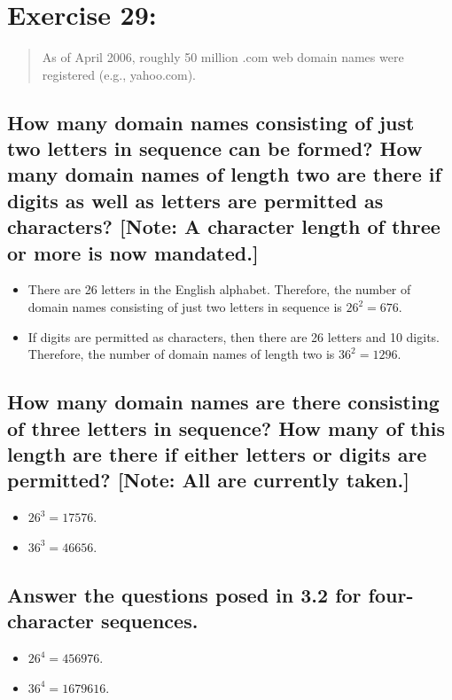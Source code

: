 \newpage
\section{Exercise 29:}
\begin{quote}
    As of April 2006, roughly 50 million .com web domain names were registered (e.g., yahoo.com).
\end{quote}

\subsection{ How many domain names consisting of just two letters in sequence can be formed? How many domain names of length two are there if digits as well as letters are permitted as characters? [Note: A character length of three or more is now mandated.]}


\begin{itemize}
    \item There are 26 letters in the English alphabet. Therefore, the number of domain names consisting of just two letters in sequence is \(26^2 = 676\).
    \item If digits are permitted as characters, then there are 26 letters and 10 digits. Therefore, the number of domain names of length two is \(36^2 = 1296\).
\end{itemize}

\subsection{How many domain names are there consisting of
three letters in sequence? How many of this length
are there if either letters or digits are permitted?
[Note: All are currently taken.]}

\begin{itemize}
    \item \(26^3 = 17576\).
    \item \(36^3 = 46656\).
\end{itemize}

\subsection{Answer the questions posed in 3.2 for four-character
    sequences.}

\begin{itemize}
    \item \(26^4 = 456976\).
    \item \(36^4 = 1679616\).
\end{itemize}

